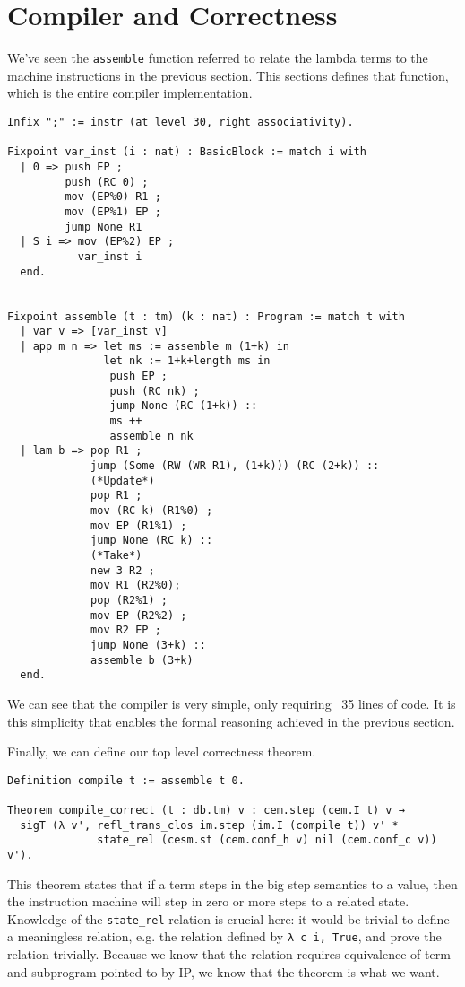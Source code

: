 \section{Compiler and Correctness}

We've seen the \texttt{assemble} function referred to relate the lambda terms to
the machine instructions in the previous section. This sections defines that
function, which is the entire compiler implementation.

\begin{verbatim}
Infix ";" := instr (at level 30, right associativity).

Fixpoint var_inst (i : nat) : BasicBlock := match i with
  | 0 => push EP ;
         push (RC 0) ;
         mov (EP%0) R1 ;
         mov (EP%1) EP ;
         jump None R1
  | S i => mov (EP%2) EP ; 
           var_inst i
  end.


Fixpoint assemble (t : tm) (k : nat) : Program := match t with  
  | var v => [var_inst v]
  | app m n => let ms := assemble m (1+k) in
               let nk := 1+k+length ms in
                push EP ;
                push (RC nk) ;
                jump None (RC (1+k)) :: 
                ms ++ 
                assemble n nk
  | lam b => pop R1 ;
             jump (Some (RW (WR R1), (1+k))) (RC (2+k)) ::
             (*Update*)
             pop R1 ;  
             mov (RC k) (R1%0) ;
             mov EP (R1%1) ;
             jump None (RC k) ::
             (*Take*)
             new 3 R2 ;
             mov R1 (R2%0);
             pop (R2%1) ;
             mov EP (R2%2) ;
             mov R2 EP ;
             jump None (3+k) :: 
             assemble b (3+k)
  end. 
\end{verbatim}
We can see that the compiler is very simple, only requiring ~35 lines of code.
It is this simplicity that enables the formal reasoning achieved in the previous
section. 

Finally, we can define our top level correctness theorem.

\begin{verbatim}
Definition compile t := assemble t 0.

Theorem compile_correct (t : db.tm) v : cem.step (cem.I t) v → 
  sigT (λ v', refl_trans_clos im.step (im.I (compile t)) v' *
              state_rel (cesm.st (cem.conf_h v) nil (cem.conf_c v)) v').
\end{verbatim}
This theorem states that if a term steps in the big step semantics to a value,
then the instruction machine will step in zero or more steps to a related state.
Knowledge of the \texttt{state\_rel} relation is crucial here: it would be
trivial to define a meaningless relation, e.g. the relation defined by
\texttt{λ c i, True}, and prove the relation trivially. Because we know that
the relation requires equivalence of term and subprogram pointed to by IP, we
know that the theorem is what we want.

